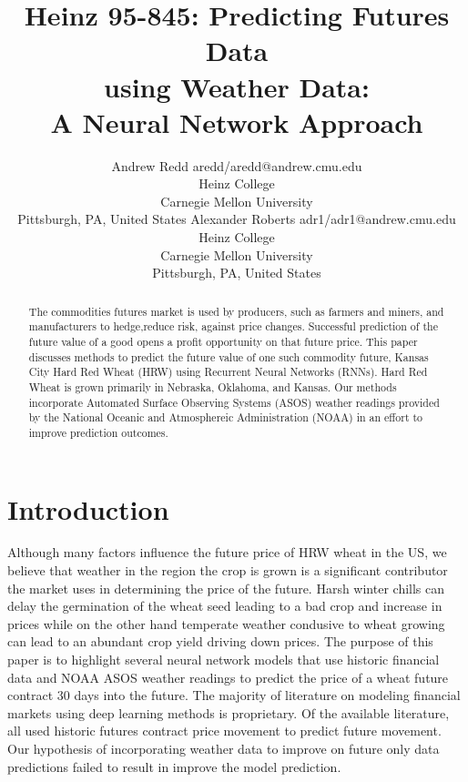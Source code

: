 \documentclass[twoside,11pt]{article}
\begin{document}
\title{Heinz 95-845: Predicting Futures Data\\ using Weather Data:\\ A Neural Network Approach}

\author{\name Andrew Redd \email aredd/aredd@andrew.cmu.edu \\
       \addr Heinz College\\
       Carnegie Mellon University\\
       Pittsburgh, PA, United States
       \AND
       \name Alexander Roberts \email adr1/adr1@andrew.cmu.edu \\
       \addr Heinz College\\
       Carnegie Mellon University\\
       Pittsburgh, PA, United States}


\maketitle

\begin{abstract}
  The commodities futures market is used by producers, such as farmers and miners, and manufacturers to hedge,reduce risk, against price changes. Successful prediction of the future value of a good opens a profit opportunity on that future price. This paper discusses methods to predict the future value of one such commodity future, Kansas City Hard Red Wheat (HRW) using Recurrent Neural Networks (RNNs). Hard Red Wheat is grown primarily in Nebraska, Oklahoma, and Kansas. Our methods incorporate Automated Surface Observing Systems (ASOS) weather readings provided by the National Oceanic and Atmosphereic Administration (NOAA) in an effort to improve prediction outcomes.
\end{abstract}

\section{Introduction}

Although many factors influence the future price of HRW wheat in the US, we believe that weather in the region the crop is grown is a significant contributor the market uses in determining the price of the future.  Harsh winter chills can delay the germination of the wheat seed leading to a bad crop and increase in prices while on the other hand temperate weather condusive to wheat growing can lead to an abundant crop yield driving down prices.  The purpose of this paper is to highlight several neural network models that use historic financial data and NOAA ASOS weather readings to predict the price of a wheat future contract 30 days into the future. The majority of literature on modeling financial markets using deep learning methods is proprietary. Of the available literature, all used historic futures contract price movement to predict future movement. Our hypothesis of incorporating weather data to improve on future only data predictions failed to result in improve the model prediction. 
\end{document}
